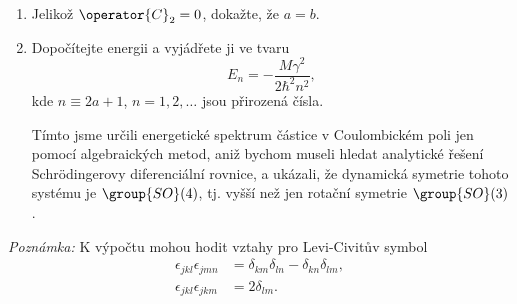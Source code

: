 \begin{enumerate}
	\item 
		Jelikož $\operator{C}_{2}=0$, dokažte, že $a=b$.

	\item 
		Dopočítejte energii a vyjádřete ji ve tvaru
		\begin{equation}
			E_{n}=-\frac{M\gamma^{2}}{2\hbar^{2}n^{2}},
		\end{equation}
		kde $n\equiv 2a+1$, $n=1,2,\dots$ jsou přirozená čísla.

	Tímto jsme určili energetické spektrum částice v Coulombickém poli 
	jen pomocí algebraických metod, aniž bychom museli hledat analytické řešení Schrödingerovy diferenciální rovnice, a ukázali, že dynamická symetrie tohoto systému je $\group{SO}(4)$, tj. vyšší než jen rotační symetrie $\group{SO}(3)$.
\end{enumerate}

\emph{Poznámka:} K výpočtu mohou hodit vztahy pro Levi-Civitův symbol
    \begin{subequations}
        \begin{align}
            \epsilon_{jkl}\epsilon_{jmn}&=\delta_{km}\delta_{ln}-\delta_{kn}\delta_{lm},\\
            \epsilon_{jkl}\epsilon_{jkm}&=2\delta_{lm}.
        \end{align}    
    \end{subequations}
